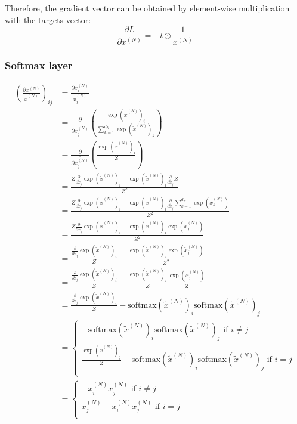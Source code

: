 \documentclass{article}
\begin{document}
Therefore, the gradient vector can be obtained by element-wise multiplication with the targets vector:
\begin{equation}
\frac{\partial L}{\partial x^{(N)}} = -t\odot\frac{1}{x^{(N)}}
\end{equation}


\subsubsection*{Softmax layer}


\begin{align}
\left(\frac{\partial x^{(N)}}{\tilde{x}^{(N)}}\right)_{ij}
&= \frac{\partial x^{(N)}_i}{\tilde{x}^{(N)}_j}\\
&=
\frac{\partial}{\partial\tilde{x^{(N)}_j}}\left(
\frac{\exp(\tilde{x}^{(N)})_i}{\sum_{k=1}^{d_N} \exp(\tilde{x}^{(N)})_k}
\right)\\
&=
\frac{\partial}{\partial\tilde{x^{(N)}_j}}\left(
\frac{\exp(\tilde{x}^{(N)})_i}{Z}
\right)\\
&=
\frac{Z\frac{\partial}{\partial\tilde{x}_j}\exp(\tilde{x}^{(N)})_i-\exp(\tilde{x}^{(N)})_i\frac{\partial}{\partial\tilde{x}_j}Z}{Z^2}\\
&=
\frac{Z\frac{\partial}{\partial\tilde{x}_j}\exp(\tilde{x}^{(N)})_i-\exp(\tilde{x}^{(N)})_i\frac{\partial}{\partial\tilde{x}_j}\sum_{k=1}^{d_N} \exp(\tilde{x}^{(N)}_k)}{Z^2}\\
&=
\frac{Z\frac{\partial}{\partial\tilde{x}_j}\exp(\tilde{x}^{(N)})_i-\exp(\tilde{x}^{(N)})_i \exp(\tilde{x}^{(N)}_j)}{Z^2}\\
&=
\frac{\frac{\partial}{\partial\tilde{x}_j}\exp(\tilde{x}^{(N)})_i}{Z}-\frac{\exp(\tilde{x}^{(N)})_i \exp(\tilde{x}^{(N)}_j)}{Z^2}\\
&=
\frac{\frac{\partial}{\partial\tilde{x}_j}\exp(\tilde{x}^{(N)})_i}{Z}-\frac{\exp(\tilde{x}^{(N)})_i}{Z}\frac{\exp(\tilde{x}^{(N)}_j)}{Z}\\
&=
\frac{\frac{\partial}{\partial\tilde{x}_j}\exp(\tilde{x}^{(N)})_i}{Z}-\text{softmax}(\tilde{x}^{(N)})_i\text{softmax}(\tilde{x}^{(N)})_j\\
&=
\left\lbrace
\begin{matrix}
-\text{softmax}(\tilde{x}^{(N)})_i\text{softmax}(\tilde{x}^{(N)})_j \text{ if } i\neq j\\
\frac{\exp(\tilde{x}^{(N)})_j}{Z}-\text{softmax}(\tilde{x}^{(N)})_i\text{softmax}(\tilde{x}^{(N)})_j\text{ if } i = j\\
\end{matrix}
\right. \\
&=
\left\lbrace
\begin{matrix}
-x^{(N)}_i x^{(N)}_j \text{ if } i\neq j\\
x^{(N)}_j-x^{(N)}_i x^{(N)}_j\text{ if } i = j\\
\end{matrix}
\right. \\
\end{align}
\end{document}
